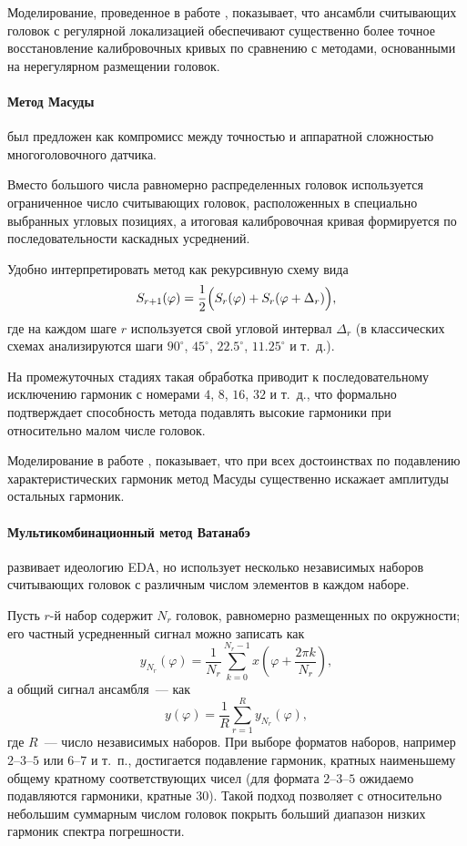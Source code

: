 Моделирование, проведенное в работе \cite{kiryanov-overview}, показывает, что ансамбли считывающих головок с регулярной локализацией обеспечивают существенно более точное восстановление калибровочных кривых по сравнению с методами, основанными на нерегулярном размещении головок.

\paragraph{Метод Масуды} \cite{masuda} был предложен как компромисс между точностью и аппаратной сложностью многоголовочного датчика.

Вместо большого числа равномерно распределенных головок используется ограниченное число считывающих головок, расположенных в специально выбранных угловых позициях, а итоговая калибровочная кривая формируется по последовательности каскадных усреднений.

Удобно интерпретировать метод как рекурсивную схему вида
$$
S_{r+1}(\varphi)
=
\frac{1}{2}
\Bigl(
S_r(\varphi) + S_r(\varphi + \Delta_r)
\Bigr),
$$
где на каждом шаге $r$ используется свой угловой интервал $\Delta_r$ (в классических схемах анализируются шаги $90^\circ$, $45^\circ$, $22.5^\circ$, $11.25^\circ$ и т.~д.).

На промежуточных стадиях такая обработка приводит к последовательному исключению гармоник с номерами $4$, $8$, $16$, $32$ и т.~д., что формально подтверждает способность метода подавлять высокие гармоники при относительно малом числе головок.

Моделирование в работе \cite{kiryanov-overview}, показывает, что при всех достоинствах по подавлению характеристических гармоник метод Масуды существенно искажает амплитуды остальных гармоник.

\paragraph{Мультикомбинационный метод Ватанабэ} \cite{watanabe-selfa}
развивает идеологию EDA, но использует несколько независимых наборов считывающих головок с различным числом элементов в каждом наборе.

Пусть $r$-й набор содержит $N_r$ головок, равномерно размещенных по окружности; его частный усредненный сигнал можно записать как
$$
y_{N_r}(\varphi)
=
\frac{1}{N_r}
\sum_{k=0}^{N_r-1}
x\left(\varphi + \frac{2\pi k}{N_r}\right),
$$
а общий сигнал ансамбля~--- как
$$
y(\varphi)
=
\frac{1}{R}
\sum_{r=1}^{R} y_{N_r}(\varphi),
$$
где $R$~--- число независимых наборов.
При выборе форматов наборов, например $2$–$3$–$5$ или $6$–$7$ и т.~п., достигается подавление гармоник, кратных наименьшему общему кратному соответствующих чисел (для формата $2$–$3$–$5$ ожидаемо подавляются гармоники, кратные $30$).
Такой подход позволяет с относительно небольшим суммарным числом головок покрыть больший диапазон низких гармоник спектра погрешности.

